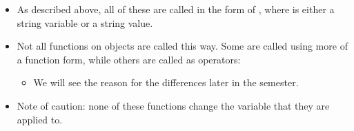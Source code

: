 \documentclass[letterpaper,10pt,english]{sphinxmanual}
\begin{document}
\begin{itemize}
\begin{sphinxVerbatim}[commandchars=\\\{\}]
\end{sphinxVerbatim}

\item {} 
As described above, all of these are called in the form of
, where  is either a string
variable or a string value.

\item {} 
Not all functions on objects are called this way. Some are called
using more of a function form, while others are called as
operators:

\begin{sphinxVerbatim}[commandchars=\\\{\}]
  
  
\end{sphinxVerbatim}
\begin{itemize}
\item {} 
We will see the reason for the differences later in the semester.

\end{itemize}

\item {} 
Note of caution:  none of these functions change the variable that they
are applied to.

\end{itemize}
\end{document}
